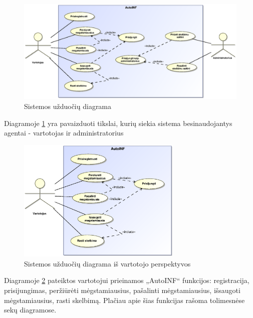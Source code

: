 \documentclass[12pt]{article}
\begin{document}
	\begin{figure}[h]
		\begin{center}
			\includegraphics[width=\textwidth]{Tikslai.eps}
			\caption{Sistemos užduočių diagrama\label{UseCase}}
		\end{center}
	\end{figure}
	
	Diagramoje \ref{UseCase} yra pavaizduoti tikslai, kurių siekia sistema besinaudojantys agentai - vartotojas ir administratorius
	\pagebreak

	\begin{figure}[h]
		\begin{center}
			\includegraphics[width=0.7\textwidth]{TikslaiVartotojas.eps}
			\caption{Sistemos užduočių diagrama iš vartotojo perspektyvos\label{UseCaseUser}}
		\end{center}
	\end{figure}
	
	Diagramoje \ref{UseCaseUser} pateiktos vartotojui prieinamos „AutoINF“ funkcijos: registracija, prisijungimas, peržiūrėti mėgstamiausius, pašalinti mėgstamiausius, išsaugoti mėgstamiausius, rasti skelbimą. Plačiau apie šias funkcijas rašoma tolimesnėse sekų diagramose.
	\pagebreak	
	
\end{document}
